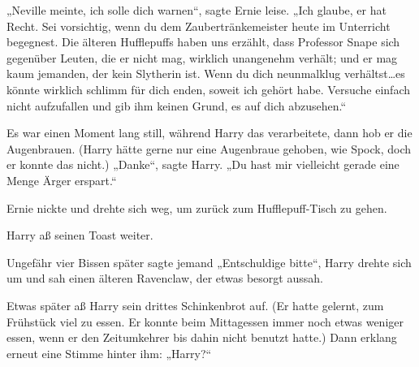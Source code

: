 „Neville meinte, ich solle dich warnen“, sagte Ernie leise. „Ich glaube, er hat Recht. Sei vorsichtig, wenn du dem Zaubertränkemeister heute im Unterricht begegnest. Die älteren Hufflepuffs haben uns erzählt, dass Professor Snape sich gegenüber Leuten, die er nicht mag, wirklich unangenehm verhält; und er mag kaum jemanden, der kein Slytherin ist. Wenn du dich neunmalklug verhältst…es könnte wirklich schlimm für dich enden, soweit ich gehört habe. Versuche einfach nicht aufzufallen und gib ihm keinen Grund, es auf dich abzusehen.“

Es war einen Moment lang still, während Harry das verarbeitete, dann hob er die Augenbrauen. (Harry hätte gerne nur eine Augenbraue gehoben, wie Spock, doch er konnte das nicht.) „Danke“, sagte Harry. „Du hast mir vielleicht gerade eine Menge Ärger erspart.“

Ernie nickte und drehte sich weg, um zurück zum Hufflepuff-Tisch zu gehen.

Harry aß seinen Toast weiter.

Ungefähr vier Bissen später sagte jemand „Entschuldige bitte“, Harry drehte sich um und sah einen älteren Ravenclaw, der etwas besorgt aussah.

Etwas später aß Harry sein drittes Schinkenbrot auf. (Er hatte gelernt, zum Frühstück viel zu essen. Er konnte beim Mittagessen immer noch etwas weniger essen, wenn er den Zeitumkehrer bis dahin nicht benutzt hatte.) Dann erklang erneut eine Stimme hinter ihm: „Harry?“

